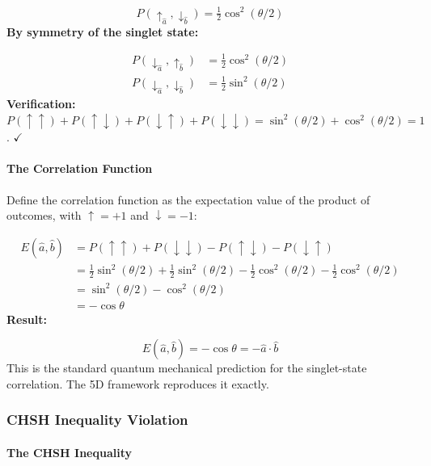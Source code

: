 \documentclass[aps,prd,preprint,superscriptaddress,longbibliography,floatfix]{revtex4-2}
\theoremstyle{remark}
\begin{document}
\begin{equation}
    P(\uparrow_{\hat{a}}, \downarrow_{\hat{b}}) = \tfrac{1}{2} \cos^2(\theta/2)
\end{equation}
\textbf{By symmetry of the singlet state:}


\begin{align}
    P(\downarrow_{\hat{a}}, \uparrow_{\hat{b}}) &= \tfrac{1}{2} \cos^2(\theta/2) \\
    P(\downarrow_{\hat{a}}, \downarrow_{\hat{b}}) &= \tfrac{1}{2} \sin^2(\theta/2)
\end{align}
\textbf{Verification:} $P(\uparrow\uparrow) + P(\uparrow\downarrow) + P(\downarrow\uparrow) + P(\downarrow\downarrow) = \sin^{2}(\theta/2) + \cos^{2}(\theta/2) = 1$. $\checkmark$


\paragraph{The Correlation Function}

Define the correlation function as the expectation value of the product of outcomes, with $\uparrow = +1$ and $\downarrow = -1$:


\begin{align}
    E(\hat{a}, \hat{b}) &= P(\uparrow\uparrow) + P(\downarrow\downarrow) - P(\uparrow\downarrow) - P(\downarrow\uparrow) \\
    & = \tfrac{1}{2}\sin^2(\theta/2) + \tfrac{1}{2}\sin^2(\theta/2) - \tfrac{1}{2}\cos^2(\theta/2) - \tfrac{1}{2}\cos^2(\theta/2) \\
    & = \sin^2(\theta/2) - \cos^2(\theta/2) \\
    & = -\cos \theta
\end{align}
\textbf{Result:}


\begin{equation}
    E(\hat{a}, \hat{b}) = -\cos \theta = -\hat{a} \cdot \hat{b}
\end{equation}
This is the standard quantum mechanical prediction for the singlet-state correlation. The 5D framework reproduces it exactly.


\subsubsection{CHSH Inequality Violation}


\paragraph{The CHSH Inequality}
\end{document}
